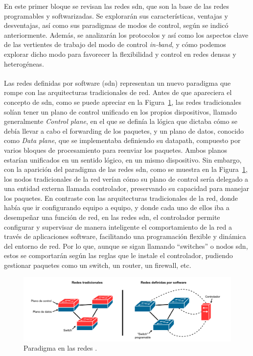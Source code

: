 En este primer bloque se revisan las redes \gls{sdn}, que son la base de las redes programables y softwarizadas. Se explorarán sus características, ventajas y desventajas, así como sus paradigmas de modos de control, según se indicó anteriormente. Además, se analizarán los protocolos y así como los aspectos clave de las vertientes de trabajo del modo de control \textit{in-band}, y cómo podemos explorar dicho modo para favorecer la flexibilidad y control en redes densas y heterogéneas.\\
\\
Las redes definidas por software (\gls{sdn}) representan un nuevo paradigma que rompe con las arquitecturas tradicionales de red. Antes de que apareciera el concepto de \gls{sdn}, como se puede apreciar en la Figura~\ref{fig:sdn_paradigma}, las redes tradicionales solían tener un plano de control unificado en los propios dispositivos, llamado generalmente \textit{Control plane}, en el que se definía la lógica que dictaba cómo se debía llevar a cabo el forwarding de los paquetes, y un plano de datos, conocido como \textit{Data plane}, que se implementaba definiendo su datapath, compuesto por varios bloques de procesamiento para reenviar los paquetes. Ambos planos estarían unificados en un sentido lógico, en un mismo dispositivo. Sin embargo, con la aparición del paradigma de las redes \gls{sdn}, como se muestra en la Figura~\ref{fig:sdn_paradigma}, los nodos tradicionales de la red verían cómo su plano de control sería delegado a una entidad externa llamada controlador, preservando su capacidad para manejar los paquetes. En contraste con las arquitecturas tradicionales de la red, donde había que ir configurando equipo a equipo, y donde cada uno de ellos iba a desempeñar una función de red, en las redes \gls{sdn}, el controlador permite configurar y supervisar de manera inteligente el comportamiento de la red a través de aplicaciones software, facilitando una programación flexible y dinámica del entorno de red. Por lo que, aunque se sigan llamando ``switches'' o nodos \gls{sdn}, estos se comportarán según las reglas que le instale el controlador, pudiendo gestionar paquetes como un switch, un router, un firewall, etc. 

\begin{figure}[ht!]
\centering
\includegraphics[width=\textwidth]{fig/02_sota/sota_1_sdn_idea.drawio.pdf}
\caption{Paradigma en las redes .}
\label{fig:sdn_paradigma}
\end{figure}

